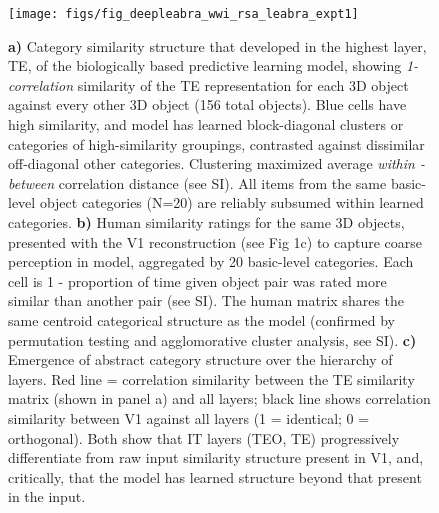 \documentclass[12pt,twoside]{naturefigs}  %
\newif\myifpdf
\begin{document}

\begin{figure}
  \centering\texttt{[image: figs/fig\_deepleabra\_wwi\_rsa\_leabra\_expt1]}
  \caption{\small \protect{} {\bf a)} Category similarity structure that developed in the highest layer, TE, of the biologically based predictive learning model, showing {\em 1-correlation} similarity of the TE representation for each 3D object against every other 3D object (156 total objects). Blue cells have high similarity, and model has learned block-diagonal clusters or categories of high-similarity groupings, contrasted against dissimilar off-diagonal other categories.  Clustering maximized average {\em within - between} correlation distance (see SI).  All items from the same basic-level object categories (N=20) are reliably subsumed within learned categories. {\bf b)} Human similarity ratings for the same 3D objects, presented with the V1 reconstruction (see Fig 1c) to capture coarse perception in model, aggregated by 20 basic-level categories.  Each cell is 1 - proportion of time given object pair was rated more similar than another pair (see SI).  The human matrix shares the same centroid categorical structure as the model (confirmed by permutation testing and agglomorative cluster analysis, see SI).  {\bf c)} Emergence of abstract category structure over the hierarchy of layers.  Red line = correlation similarity between the TE similarity matrix (shown in panel a) and all layers; black line shows correlation similarity between V1 against all layers (1 = identical; 0 = orthogonal). Both show that IT layers (TEO, TE) progressively differentiate from raw input similarity structure present in V1, and, critically, that the model has learned structure beyond that present in the input.}
  \label{fig.rsa}
\end{figure}
\end{document}
